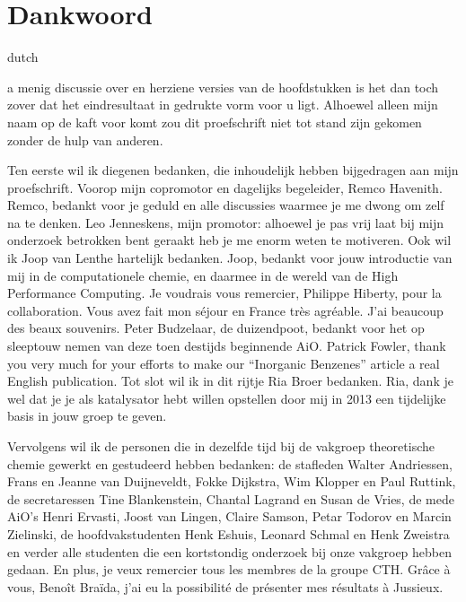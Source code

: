 \chapter*{Dankwoord}
\label{dankwoord}
\fancyhead[RO]{\thepage}
\fancyhead[LE]{\thepage}
\begin{otherlanguage*}{dutch}

\lettrine{}{}a menig discussie over en herziene versies van de hoofdstukken is het dan toch zover dat het eindresultaat in gedrukte vorm voor u ligt. Alhoewel alleen mijn naam op de kaft voor komt zou dit proefschrift niet tot stand zijn gekomen zonder de hulp van anderen.

Ten eerste wil ik diegenen bedanken, die inhoudelijk hebben bijgedragen aan mijn proefschrift. Voorop mijn copromotor en dagelijks begeleider, Remco Havenith. Remco, bedankt voor je geduld en alle discussies waarmee je me dwong om zelf na te denken. Leo Jenneskens, mijn promotor: alhoewel je pas vrij laat bij mijn onderzoek betrokken bent geraakt heb je me enorm weten te motiveren. Ook wil ik Joop van Lenthe hartelijk bedanken. Joop, bedankt voor jouw introductie van mij in de computationele chemie, en daarmee in de wereld van de High Performance Computing. Je voudrais vous remercier, Philippe Hiberty, pour la collaboration. Vous avez fait mon s\'{e}jour en France tr\`{e}s agr\'{e}able. J'ai beaucoup des beaux souvenirs. Peter Budzelaar, de duizendpoot, bedankt voor het op sleeptouw nemen van deze toen destijds beginnende AiO. Patrick Fowler, thank you very much for your efforts to make our ``Inorganic Benzenes'' article a real English publication. Tot slot wil ik in dit rijtje Ria Broer bedanken. Ria, dank je wel dat je je als katalysator hebt willen opstellen door mij in 2013 een tijdelijke basis in jouw groep te geven.

Vervolgens wil ik de personen die in dezelfde tijd bij de vakgroep theoretische chemie gewerkt en gestudeerd hebben bedanken: de stafleden Walter Andriessen, Frans en Jeanne van Duijneveldt, Fokke Dijkstra, Wim Klopper en Paul Ruttink, de secretaressen Tine Blankenstein, Chantal Lagrand en Susan de Vries, de mede AiO's Henri Ervasti, Joost van Lingen, Claire Samson, Petar Todorov en Marcin Zielinski, de hoofdvakstudenten Henk Eshuis, Leonard Schmal en Henk Zweistra en verder alle studenten die een kortstondig onderzoek bij onze vakgroep hebben gedaan. En plus, je veux remercier tous les membres de la groupe CTH. Gr\^{a}ce \`{a} vous, Beno\^{i}t Bra\"{i}da, j'ai eu la possibilit\'{e} de pr\'{e}senter mes r\'{e}sultats \`{a} Jussieux.


\end{otherlanguage*}
